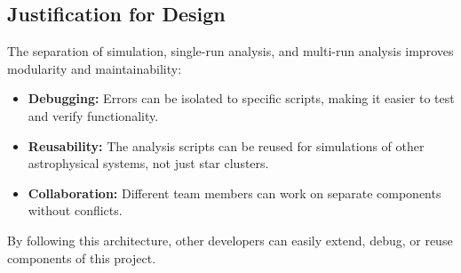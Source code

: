\documentclass[10pt,twocolumn]{article}
\begin{document}
\subsection{Justification for Design}
The separation of simulation, single-run analysis, and multi-run analysis improves modularity and maintainability:
\begin{itemize}
    \item \textbf{Debugging:} Errors can be isolated to specific scripts, making it easier to test and verify functionality.
    \item \textbf{Reusability:} The analysis scripts can be reused for simulations of other astrophysical systems, not just star clusters.
    \item \textbf{Collaboration:} Different team members can work on separate components without conflicts.
\end{itemize}

By following this architecture, other developers can easily extend, debug, or reuse components of this project.

\printbibliography
\end{document}
